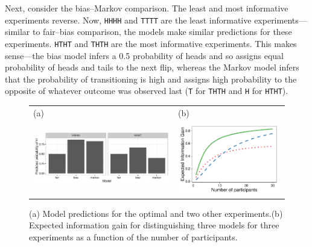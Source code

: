 \documentclass{article}
\begin{document}
Next, consider the bias--Markov comparison.
The least and most informative experiments reverse.
Now, \lstinline{HHHH} and \lstinline{TTTT} are the least informative experiments---similar to fair--bias comparison, the models make similar predictions for these experiments.
\lstinline{HTHT} and \lstinline{THTH} are the most informative experiments.
This makes sense---the bias model infers a 0.5 probability of heads and so assigns equal probability of heads and tails to the next flip, whereas the Markov model infers that the probability of transitioning is high and assigns high probability to the opposite of whatever outcome was observed last (\lstinline{T} for \lstinline{THTH} and \lstinline{H} for \lstinline{HTHT}).



\begin{figure}[t]
\centering
\begin{tabular}{l l}
(a) & (b)\\
\includegraphics[width=0.6\columnwidth]{img/coin_predictions.pdf} &
\includegraphics[width=0.4\columnwidth]{img/coin_eig_3way_nsubj.pdf} \\\end{tabular}
\caption{(a) Model predictions for the optimal and two other experiments.(b) Expected information gain for distinguishing three models for three experiments as a function of the number of participants.}
\label{fig:coin_preds}
\end{figure}
\end{document}
